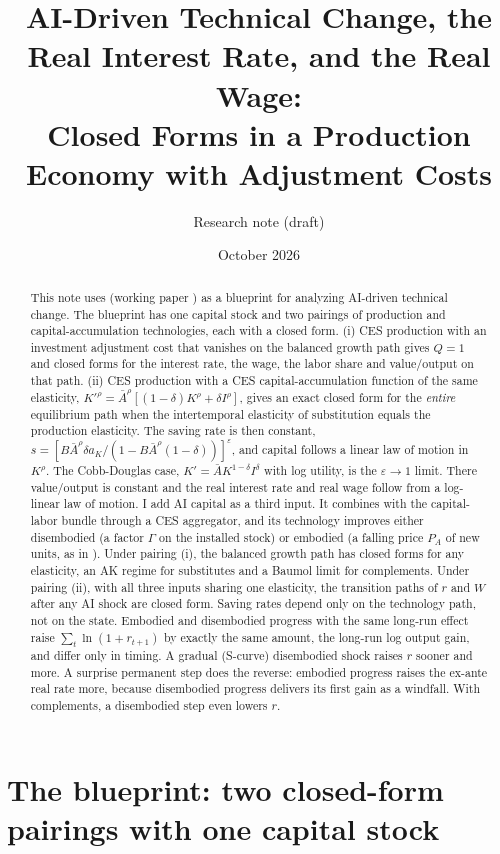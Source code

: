 \documentclass[11pt]{article}
\title{AI-Driven Technical Change, the Real Interest Rate, and the Real Wage:\\
Closed Forms in a Production Economy with Adjustment Costs}
\author{Research note (draft)}
\date{October 2026}
\newcommand{\e}{\varepsilon}
\begin{document}
\maketitle

\begin{abstract}
\noindent This note uses \citet{kiley2004} (working paper \citealp{kiley2000}) as a
blueprint for analyzing AI-driven technical change. The blueprint has one capital
stock and two pairings of production and capital-accumulation technologies, each with a
closed form. (i) CES production with an investment adjustment cost that vanishes on the
balanced growth path gives $Q=1$ and closed forms for the interest rate, the wage, the
labor share and value/output on that path. (ii) CES production with a CES
capital-accumulation function of the same elasticity,
$K'^{\rho}=\bar A^{\rho}[(1-\delta)K^{\rho}+\delta I^{\rho}]$, gives an exact closed form for the
\emph{entire} equilibrium path when the intertemporal elasticity of substitution equals
the production elasticity. The saving rate is then constant,
$s=[B\bar A^\rho\delta a_K/(1-B\bar A^\rho(1-\delta))]^{\e}$, and capital follows a linear law
of motion in $K^\rho$. The Cobb-Douglas case, $K'=\bar AK^{1-\delta}I^{\delta}$ with log utility, is
the $\e\to1$ limit. There value/output is constant and the real interest rate and real
wage follow from a log-linear law of motion. I add AI capital as a third input. It combines with the capital-labor bundle
through a CES aggregator, and its technology improves either disembodied (a factor
$\Gamma$ on the installed stock) or embodied (a falling price $P_A$ of new units, as in
\citealp{ghk1997}). Under pairing (i), the balanced growth path has closed forms for any
elasticity, an AK regime for substitutes and a Baumol limit for complements. Under
pairing (ii), with all three inputs sharing one elasticity, the transition paths of $r$
and $W$ after any AI shock are closed form. Saving rates depend only on the technology
path, not on the state.
Embodied and disembodied progress with the same long-run effect raise
$\sum_t\ln(1+r_{t+1})$ by exactly the same amount, the long-run log output gain, and
differ only in timing. A gradual (S-curve) disembodied shock raises $r$ sooner and more.
A surprise permanent step does the reverse: embodied progress raises the ex-ante real
rate more, because disembodied progress delivers its first gain as a windfall. With
complements, a disembodied step even lowers $r$.
\end{abstract}

\section{The blueprint: two closed-form pairings with one capital stock}
\end{document}
